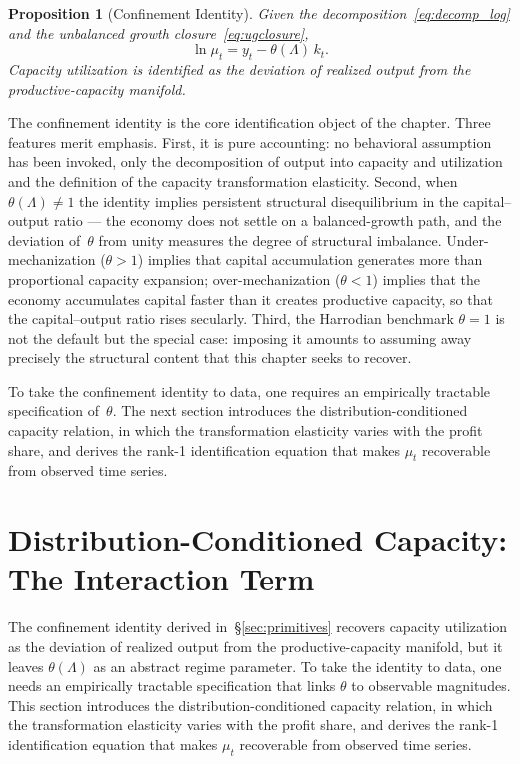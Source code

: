 \documentclass[12pt,letterpaper]{article}
\newcommand{\mut}{\mu_t}           %
\newcommand{\thetaL}{\theta(\Lambda)}  %
\newtheorem{proposition}{Proposition}[section]
\begin{document}
\begin{proposition}[Confinement Identity]
\label{prop:confinement}
Given the decomposition~\eqref{eq:decomp_log} and the unbalanced growth
closure~\eqref{eq:ugclosure},
\begin{equation}
  \ln\mut = y_t - \thetaL\, k_t.
  \label{eq:confinement}
\end{equation}
Capacity utilization is identified as the deviation of realized output from
the productive-capacity manifold.
\end{proposition}

The confinement identity is the core identification object of the chapter.
Three features merit emphasis. First, it is pure accounting: no behavioral
assumption has been invoked, only the decomposition of output into capacity and
utilization and the definition of the capacity transformation elasticity.
Second, when $\thetaL \neq 1$ the identity implies persistent structural
disequilibrium in the capital--output ratio --- the economy does not settle on a
balanced-growth path, and the deviation of~$\theta$ from unity measures the
degree of structural imbalance. Under-mechanization ($\theta > 1$) implies that
capital accumulation generates more than proportional capacity expansion;
over-mechanization ($\theta < 1$) implies that the economy accumulates capital
faster than it creates productive capacity, so that the capital--output ratio
rises secularly. Third, the Harrodian benchmark $\theta = 1$ is not the default
but the special case: imposing it amounts to assuming away precisely the
structural content that this chapter seeks to recover.

To take the confinement identity to data, one requires an empirically tractable
specification of~$\theta$. The next section introduces the
distribution-conditioned capacity relation, in which the transformation
elasticity varies with the profit share, and derives the rank-1 identification
equation that makes $\mut$ recoverable from observed time series.


\section{Distribution-Conditioned Capacity: The Interaction Term}
\label{sec:distribution}

The confinement identity derived in~\S\ref{sec:primitives} recovers capacity
utilization as the deviation of realized output from the productive-capacity
manifold, but it leaves $\thetaL$ as an abstract regime parameter. To take the
identity to data, one needs an empirically tractable specification that links
$\theta$ to observable magnitudes. This section introduces the
distribution-conditioned capacity relation, in which the transformation
elasticity varies with the profit share, and derives the rank-1 identification
equation that makes $\mut$ recoverable from observed time series.
\end{document}
